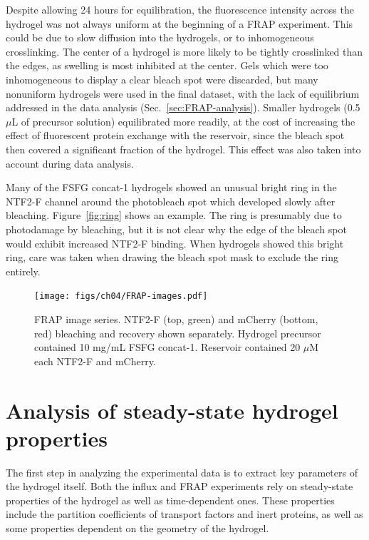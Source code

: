 Despite allowing 24 hours for equilibration, the fluorescence intensity across the hydrogel was not always uniform at the beginning of a FRAP experiment.  This could be due to slow diffusion into the hydrogels, or to inhomogeneous crosslinking.  The center of a hydrogel is more likely to be tightly crosslinked than the edges, as swelling is most inhibited at the center.  Gels which were too inhomogeneous to display a clear bleach spot were discarded, but many nonuniform hydrogels were used in the final dataset, with the lack of equilibrium addressed in the data analysis (Sec.~\ref{sec:FRAP-analysis}).  Smaller hydrogels (0.5 $\mu$L of precursor solution) equilibrated more readily, at the cost of increasing the effect of fluorescent protein exchange with the reservoir, since the bleach spot then covered a significant fraction of the hydrogel.  This effect was also taken into account during data analysis.

Many of the FSFG concat-1 hydrogels showed an unusual bright ring in the NTF2-F channel around the photobleach spot which developed slowly after bleaching.  Figure~\ref{fig:ring} shows an example.  The ring is presumably due to photodamage by bleaching, but it is not clear why the edge of the bleach spot would exhibit increased NTF2-F binding.  When hydrogels showed this bright ring, care was taken when drawing the bleach spot mask to exclude the ring entirely.

\begin{figure} 
\caption[FRAP image series.]{FRAP image series. NTF2-F (top, green) and mCherry (bottom, red) bleaching and recovery shown separately.  Hydrogel precursor contained 10 mg/mL FSFG concat-1.  Reservoir contained 20 $\mu$M each NTF2-F and mCherry. }
\centering
\texttt{[image: figs/ch04/FRAP-images.pdf]}
\label{fig:frap-images}
\end{figure} 

\section{Analysis of steady-state hydrogel properties}

The first step in analyzing the experimental data is to extract key parameters of the hydrogel itself.  Both the influx and FRAP experiments rely on steady-state properties of the hydrogel as well as time-dependent ones.  These properties include the partition coefficients of transport factors and inert proteins, as well as some properties dependent on the geometry of the hydrogel.

